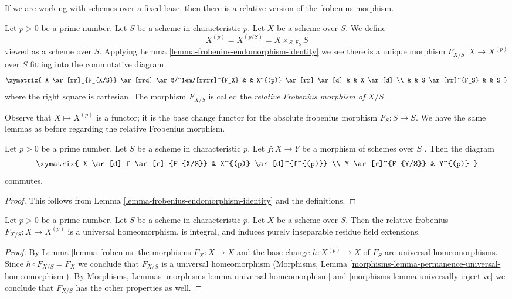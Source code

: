 \noindent
If we are working with schemes over a fixed base, then there is a
relative version of the frobenius morphism.

\begin{definition}
\label{definition-relative-frobenius}
Let $p > 0$ be a prime number. Let $S$ be a scheme in characteristic $p$.
Let $X$ be a scheme over $S$. We define
$$
X^{(p)} = X^{(p/S)} = X \times_{S, F_S} S
$$
viewed as a scheme over $S$. Applying
Lemma \ref{lemma-frobenius-endomorphism-identity}
we see there is a unique morphism $F_{X/S} : X \longrightarrow X^{(p)}$
over $S$ fitting into the commutative diagram
$$
\xymatrix{
X \ar[rr]_{F_{X/S}} \ar[rrd] \ar@/^1em/[rrrr]^{F_X}
& & X^{(p)} \ar[rr] \ar[d] & & X \ar[d] \\
& & S \ar[rr]^{F_S} & & S
}
$$
where the right square is cartesian. The morphism $F_{X/S}$ is called the
{\it relative Frobenius morphism of $X/S$}.
\end{definition}

\noindent
Observe that $X \mapsto X^{(p)}$ is a functor; it is the base change
functor for the absolute frobenius morphism $F_S : S \to S$.
We have the same lemmas as before regarding the relative Frobenius morphism.

\begin{lemma}
\label{lemma-relative-frobenius-endomorphism-identity}
Let $p > 0$ be a prime number. Let $S$ be a scheme in characteristic $p$.
Let $f : X \to Y$ be a morphism of schemes over $S$ .
Then the diagram
$$
\xymatrix{
X \ar[d]_f \ar[r]_{F_{X/S}} & X^{(p)} \ar[d]^{f^{(p)}} \\
Y \ar[r]^{F_{Y/S}} & Y^{(p)}
}
$$
commutes.
\end{lemma}

\begin{proof}
This follows from Lemma \ref{lemma-frobenius-endomorphism-identity}
and the definitions.
\end{proof}

\begin{lemma}
\label{lemma-relative-frobenius}
Let $p > 0$ be a prime number. Let $S$ be a scheme in characteristic $p$.
Let $X$ be a scheme over $S$.
Then the relative frobenius $F_{X/S} : X \to X^{(p)}$
is a universal homeomorphism, is integral, and
induces purely inseparable residue field extensions.
\end{lemma}

\begin{proof}
By Lemma \ref{lemma-frobenius} the morphisms $F_X : X \to X$ and the base change
$h : X^{(p)} \to X$ of $F_S$ are universal homeomorphisms.
Since $h \circ F_{X/S} = F_X$ we conclude that $F_{X/S}$ is a universal
homeomorphism (Morphisms, Lemma
\ref{morphisms-lemma-permanence-universal-homeomorphism}). By Morphisms, Lemmas
\ref{morphisms-lemma-universal-homeomorphism} and
\ref{morphisms-lemma-universally-injective}
we conclude that $F_{X/S}$ has the other properties as well.
\end{proof}


